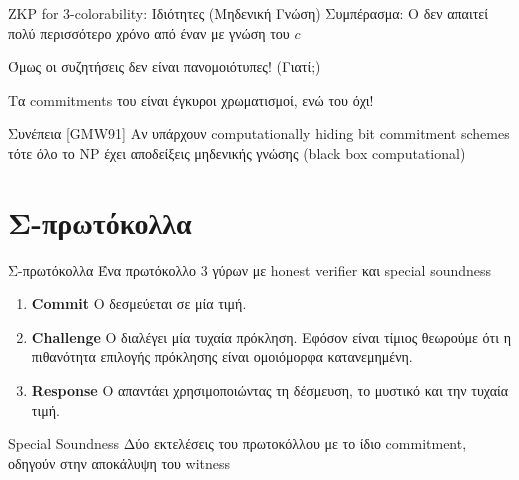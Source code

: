 \documentclass[handout]{beamer}
\begin{document}
\begin{frame}{ZKP for 3-colorability: Ιδιότητες (Μηδενική Γνώση)} 
Συμπέρασμα: \pause
Ο \siml δεν απαιτεί πολύ περισσότερο χρόνο από έναν \prv με γνώση του $c$ \pause

\alert{Όμως οι συζητήσεις δεν είναι πανομοιότυπες! (Γιατί;)}

\pause 
Τα commitments του \prv είναι έγκυροι χρωματισμοί, ενώ του \siml όχι!
\pause
\begin{block}{Συνέπεια [GMW91]}
Αν υπάρχουν computationally hiding bit commitment schemes τότε όλο το NP έχει αποδείξεις μηδενικής γνώσης (black box computational)
\end{block}

\end{frame}



\section{Σ-πρωτόκολλα}

\begin{frame}{Σ-πρωτόκολλα}
Ένα πρωτόκολλο 3 γύρων με honest verifier και special soundness
\begin{enumerate}
	\item \textbf{Commit} O \prv δεσμεύεται σε μία τιμή. \pause 
	\item \textbf{Challenge} Ο \ver διαλέγει μία τυχαία πρόκληση. Εφόσον είναι τίμιος θεωρούμε ότι η πιθανότητα επιλογής πρόκλησης είναι ομοιόμορφα κατανεμημένη. \pause
	\item \textbf{Response} O \prv απαντάει χρησιμοποιώντας τη δέσμευση, το μυστικό και την τυχαία τιμή. \pause
\end{enumerate}

\begin{block}{Special Soundness}
Δύο εκτελέσεις του πρωτοκόλλου με το ίδιο commitment, οδηγούν στην αποκάλυψη του witness
\end{block}
\end{frame}
\end{document}
